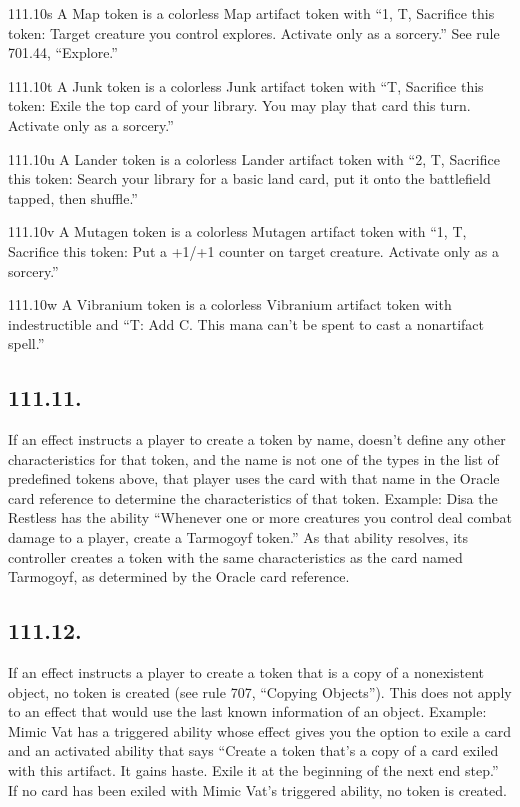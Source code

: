 111.10s A Map token is a colorless Map artifact token with “{1}, {T}, Sacrifice this token: Target creature you control explores. Activate only as a sorcery.” See rule 701.44, “Explore.”

111.10t A Junk token is a colorless Junk artifact token with “{T}, Sacrifice this token: Exile the top card of your library. You may play that card this turn. Activate only as a sorcery.”

111.10u A Lander token is a colorless Lander artifact token with “{2}, {T}, Sacrifice this token: Search your library for a basic land card, put it onto the battlefield tapped, then shuffle.”

111.10v A Mutagen token is a colorless Mutagen artifact token with “{1}, {T}, Sacrifice this token: Put a +1/+1 counter on target creature. Activate only as a sorcery.”

111.10w A Vibranium token is a colorless Vibranium artifact token with indestructible and “{T}: Add {C}. This mana can’t be spent to cast a nonartifact spell.”

\subsection*{111.11.}
If an effect instructs a player to create a token by name, doesn’t define any other characteristics for that token, and the name is not one of the types in the list of predefined tokens above, that player uses the card with that name in the Oracle card reference to determine the characteristics of that token.
Example: Disa the Restless has the ability “Whenever one or more creatures you control deal combat damage to a player, create a Tarmogoyf token.” As that ability resolves, its controller creates a token with the same characteristics as the card named Tarmogoyf, as determined by the Oracle card reference.

\subsection*{111.12.}
If an effect instructs a player to create a token that is a copy of a nonexistent object, no token is created (see rule 707, “Copying Objects”). This does not apply to an effect that would use the last known information of an object.
Example: Mimic Vat has a triggered ability whose effect gives you the option to exile a card and an activated ability that says “Create a token that’s a copy of a card exiled with this artifact. It gains haste. Exile it at the beginning of the next end step.” If no card has been exiled with Mimic Vat’s triggered ability, no token is created.

